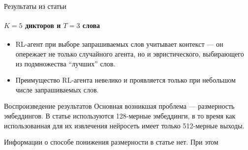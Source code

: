\documentclass[aspectratio=169]{beamer}
\begin{document}
\begin{frame}{Результаты из статьи}
    \framesubtitle{$K = 5$ дикторов и $T = 3$ слова}
    \begin{figure}[htb]
    \end{figure}

    \begin{itemize}
        \item <1->  RL-агент при выборе запрашиваемых слов учитывает контекст ---
        он опережает не только случайного агента, но и эвристического,
        выбирающего из подмножества ``лучших'' слов.
        \item <2-> Преимущество RL-агента невелико и проявляется только при
        небольшом числе запрашиваемых слов.
    \end{itemize}
\end{frame}

\begin{frame}{Воспроизведение результатов}
    Основная возникшая проблема --- размерность эмбеддингов. В статье
    используются 128-мерные эмбеддинги, в то время как использованная для их
    извлечения нейросеть имеет только 512-мерные выходы.

    Информации о способе понижения размерности в статье нет. При этом
\end{frame}
\end{document}

